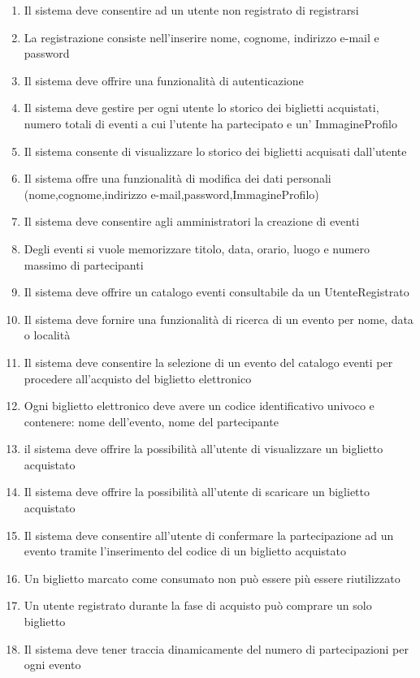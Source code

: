 \begin{enumerate}[]
    \item Il sistema deve consentire ad un utente non registrato di registrarsi
    \item La registrazione consiste nell’inserire nome, cognome, indirizzo e-mail e password
    \item Il sistema deve offrire una funzionalità di autenticazione
    \item Il sistema deve gestire per ogni utente lo storico dei biglietti acquistati, numero totali di eventi a cui l’utente ha partecipato e un' ImmagineProfilo
    \item Il sistema consente di visualizzare lo storico dei biglietti acquisati dall'utente
    \item Il sistema offre una funzionalità di modifica dei dati personali (nome,cognome,indirizzo e-mail,password,ImmagineProfilo)
    \item Il sistema deve consentire agli amministratori la creazione di eventi
    \item Degli eventi si vuole memorizzare titolo, data, orario, luogo e numero massimo di partecipanti
    \item Il sistema deve offrire un catalogo eventi consultabile da un UtenteRegistrato
    \item Il sistema deve fornire una funzionalità di ricerca di un evento per nome, data o località
    \item Il sistema deve consentire la selezione di un evento del catalogo eventi per procedere all’acquisto del biglietto elettronico
    \item Ogni biglietto elettronico deve avere un codice identificativo univoco e contenere: nome dell’evento, nome del partecipante
    \item il sistema deve offrire la possibilità all'utente di visualizzare un biglietto acquistato
    \item Il sistema deve offrire la possibilità all'utente di scaricare un biglietto acquistato
    \item Il sistema deve consentire all’utente di confermare la partecipazione ad un evento tramite l’inserimento del codice di un biglietto acquistato
    \item Un biglietto marcato come consumato non può essere più essere riutilizzato
    \item Un utente registrato durante la fase di acquisto può comprare un solo biglietto
    \item Il sistema deve tener traccia dinamicamente del numero di partecipazioni per ogni evento

\end{enumerate}
